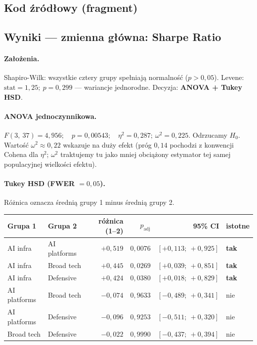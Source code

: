 \documentclass[11pt,a4paper]{article}
\begin{document}
\subsection{Kod źródłowy (fragment)}


\subsection{Wyniki --- zmienna główna: Sharpe Ratio}

\paragraph{Założenia.}
Shapiro-Wilk: wszystkie cztery grupy spełniają normalność ($p > 0{,}05$).
Levene: $\text{stat} = 1{,}25;\ p = 0{,}299$ --- wariancje jednorodne. Decyzja:
\textbf{ANOVA + Tukey HSD}.

\paragraph{ANOVA jednoczynnikowa.}
$F(3,\ 37) = 4{,}956;\quad p = 0{,}00543;\quad \eta^2 = 0{,}287;\ \omega^2 = 0{,}225$.
Odrzucamy $H_0$. Wartość $\omega^2 \approx 0{,}22$ wskazuje na duży efekt
(próg $0{,}14$ pochodzi z konwencji Cohena dla $\eta^2$; $\omega^2$ traktujemy
tu jako mniej obciążony estymator tej samej populacyjnej wielkości efektu).

\paragraph{Tukey HSD (FWER $= 0{,}05$).} Różnica oznacza średnią grupy 1 minus średnią grupy 2.
\begin{center}\small
\begin{tabular}{llrrrl}
\toprule
Grupa 1 & Grupa 2 & różnica (1--2) & $p_\text{adj}$ & 95\% CI & istotne \\
\midrule
AI infra     & AI platforms & $+0{,}519$ & $0{,}0076$ & $[+0{,}113;\ +0{,}925]$ & \textbf{tak} \\
AI infra     & Broad tech   & $+0{,}445$ & $0{,}0269$ & $[+0{,}039;\ +0{,}851]$ & \textbf{tak} \\
AI infra     & Defensive    & $+0{,}424$ & $0{,}0380$ & $[+0{,}018;\ +0{,}829]$ & \textbf{tak} \\
AI platforms & Broad tech   & $-0{,}074$ & $0{,}9633$ & $[-0{,}489;\ +0{,}341]$ & nie \\
AI platforms & Defensive    & $-0{,}096$ & $0{,}9253$ & $[-0{,}511;\ +0{,}320]$ & nie \\
Broad tech   & Defensive    & $-0{,}022$ & $0{,}9990$ & $[-0{,}437;\ +0{,}394]$ & nie \\
\bottomrule
\end{tabular}
\end{center}
\end{document}
